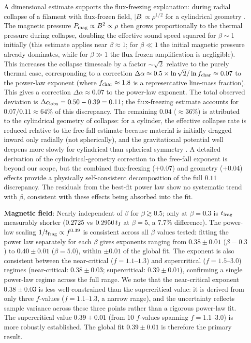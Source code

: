 \documentclass[twoside,twocolumn]{mnras}
\begin{document}
A dimensional estimate supports the flux-freezing explanation: during radial collapse of a filament with flux-frozen field, $|B| \propto \rho^{1/2}$ for a cylindrical geometry \citep{Nakamura1993}. The magnetic pressure $P_{\rm mag} \propto B^2 \propto \rho$ then grows proportionally to the thermal pressure during collapse, doubling the effective sound speed squared for $\beta \sim 1$ initially (this estimate applies near $\beta \approx 1$; for $\beta \ll 1$ the initial magnetic pressure already dominates, while for $\beta \gg 1$ the flux-frozen amplification is negligible). This increases the collapse timescale by a factor $\sim\sqrt{2}$ relative to the purely thermal case, corresponding to a correction $\Delta\alpha \approx 0.5 \times \ln\sqrt{2}/\ln f_{\rm char} \approx 0.07$ to the power-law exponent (where $f_{\rm char} \approx 1.8$ is a representative line-mass fraction). This gives a correction $\Delta\alpha \approx 0.07$ to the power-law exponent.
The total observed deviation is $\Delta\alpha_{\rm obs} = 0.50 - 0.39 = 0.11$; the flux-freezing
estimate accounts for $0.07/0.11 \approx 64\%$ of this discrepancy. The remaining $0.04$
($\approx 36\%$) is attributed to the cylindrical geometry of collapse: for a cylinder,
the effective collapse rate is reduced relative to the free-fall estimate because material
is initially dragged inward only radially (not spherically), and the gravitational potential
well deepens more slowly for cylindrical than spherical symmetry \citep{Nakamura1993}.
A detailed derivation of the cylindrical-geometry correction to the free-fall exponent
is beyond our scope, but the combined flux-freezing ($+0.07$) and geometry ($+0.04$)
effects provide a physically self-consistent decomposition of the full $0.11$ discrepancy.
The residuals from the best-fit power law show no systematic trend with $\beta$, consistent
with these effects being absorbed into the fit.

\textbf{Magnetic field}: Nearly independent of $\beta$ for $\beta \gtrsim 0.5$; only
at $\beta = 0.3$ is $t_{\rm frag}$ measurably shorter ($0.2725$ vs $0.2950\,t_{\rm J}$
at $\beta = 5$, a 7.7\% difference). The power-law scaling $1/t_{\rm frag} \propto f^{0.39}$
is consistent across all $\beta$ values tested: fitting the power law separately for each
$\beta$ gives exponents ranging from $0.38 \pm 0.01$ ($\beta = 0.3$) to $0.40 \pm 0.01$
($\beta = 5.0$), within $\pm 0.01$ of the global fit. The exponent is also consistent
between the near-critical ($f = 1.1$--$1.3$) and supercritical ($f = 1.5$--$3.0$)
regimes (near-critical: $0.38 \pm 0.03$; supercritical: $0.39 \pm 0.01$), confirming
a single power-law regime across the full range. We note that the near-critical exponent
$0.38 \pm 0.03$ is less well-constrained than the supercritical value: it is derived from
only three $f$-values ($f = 1.1$--$1.3$, a narrow range), and the uncertainty reflects
sample variance across these three points rather than a rigorous power-law fit. The
supercritical value $0.39 \pm 0.01$ (from 10 $f$-values spanning $f = 1.1$--$3.0$) is
more robustly established. The global fit $0.39 \pm 0.01$ is therefore the primary result.
\end{document}
